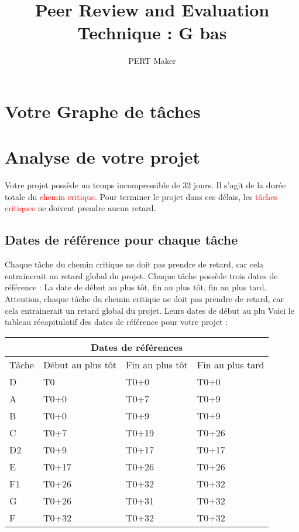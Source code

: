 \documentclass{article}
\title{\centering Peer Review and Evaluation Technique : G bas
}
\author{PERT Maker}
\begin{document}
\maketitle
\tableofcontents{}
\section{Votre Graphe de tâches}
\begin{center}
\end{center}
\section{Analyse de votre projet}
Votre projet possède un temps incompressible de 32 jours.
    Il s'agit de la durée totale du \textcolor{red}{chemin critique}.
    Pour terminer le projet dans ces délais, les \textcolor{red}{tâches critiques} ne doivent prendre aucun retard.\subsection{Dates de référence pour chaque tâche}Chaque tâche du chemin critique ne doit pas prendre de
    retard, car cela entrainerait un retard global du projet. 
    Chaque tâche possède trois dates de référence : La date de début au plus tôt,
    fin au plus tôt, fin au plus tard.
    Attention, chaque tâche du chemin critique ne doit pas prendre de
    retard, car cela entrainerait un retard global du projet. Leurs dates de début au plu
    Voici le tableau récapitulatif des dates de référence pour votre projet :\newline 
\begin{tabular}{ |p{3cm}||p{3cm}|p{3cm}|p{3cm}|  }
        \hline
        \multicolumn{4}{|c|}{Dates de références} \\
        \hline 
        Tâche&Début au plus tôt&Fin au plus tôt&Fin au plus tard \\ 
        \hline 
 D&T0&T0+0&T0+0 \\ 
 A&T0+0&T0+7&T0+9 \\ 
 B&T0+0&T0+9&T0+9 \\ 
 C&T0+7&T0+19&T0+26 \\ 
 D2&T0+9&T0+17&T0+17 \\ 
 E&T0+17&T0+26&T0+26 \\ 
 F1&T0+26&T0+32&T0+32 \\ 
 G&T0+26&T0+31&T0+32 \\ 
 F&T0+32&T0+32&T0+32 \\ 
\hline
    \end{tabular} 
\end{document}
